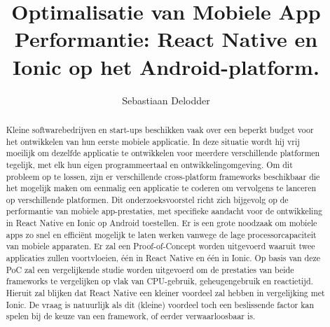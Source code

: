 \documentclass{hogent-article}
\title{Optimalisatie van Mobiele App Performantie: React Native en Ionic op het Android-platform.}
\author{Sebastiaan Delodder}
\begin{document}
\begin{abstract}
  Kleine softwarebedrijven en start-ups beschikken vaak over een beperkt budget voor het ontwikkelen van hun eerste mobiele applicatie. In deze situatie wordt hij vrij moeilijk om dezelfde applicatie te ontwikkelen voor meerdere verschillende platformen tegelijk, met elk hun eigen programmeertaal en ontwikkelingomgeving. Om dit probleem op te lossen, zijn er verschillende cross-platform frameworks beschikbaar die het mogelijk maken om eenmalig een applicatie te coderen om vervolgens te lanceren op verschillende platformen. Dit onderzoeksvoorstel richt zich bijgevolg op de performantie van mobiele app-prestaties, met specifieke aandacht voor de ontwikkeling in React Native en Ionic op Android toestellen. Er is een grote noodzaak om mobiele apps zo snel en efficiënt mogelijk te laten werken vanwege de lage processorcapaciteit van mobiele apparaten. Er zal een Proof-of-Concept worden uitgevoerd waaruit twee applicaties zullen voortvloeien, één in React Native en één in Ionic. Op basis van deze PoC zal een vergelijkende studie worden uitgevoerd om de prestaties van beide frameworks te vergelijken op vlak van CPU-gebruik, geheugengebruik en reactietijd. Hieruit zal blijken dat React Native een kleiner voordeel zal hebben in vergelijking met Ionic. De vraag is natuurlijk als dit (kleine) voordeel toch een beslissende factor kan spelen bij de keuze van een framework, of eerder verwaarloosbaar is.
\end{abstract}

\tableofcontents



\printbibliography[heading=bibintoc]
\end{document}
